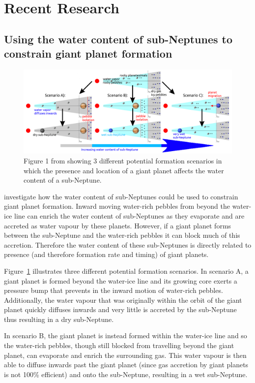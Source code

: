 \documentclass[twocolumn]{aastex631}
\begin{document}
\section{Recent Research}

\subsection{Using the water content of sub-Neptunes to constrain giant planet formation}

\begin{figure}
    \centering
    \includegraphics[width=\textwidth]{water_cartoon.png}
    \caption{Figure 1 from \citet{Bitsch+2021} showing 3 different potential formation scenarios in which the presence and location of a giant planet affects the water content of a sub-Neptune.}
    \label{fig:water}
\end{figure}

\citet{Bitsch+2021} investigate how the water content of sub-Neptunes could be used to constrain giant planet formation. Inward moving water-rich pebbles from beyond the water-ice line can enrich the water content of sub-Neptunes as they evaporate and are accreted as water vapour by these planets. However, if a giant planet forms between the sub-Neptune and the water-rich pebbles it can block much of this accretion. Therefore the water content of these sub-Neptunes is directly related to presence (and therefore formation rate and timing) of giant planets.

Figure~\ref{fig:water} illustrates three different potential formation scenarios. In scenario A, a giant planet is formed beyond the water-ice line and its growing core exerts a pressure bump that prevents in the inward motion of water-rich pebbles. Additionally, the water vapour that was originally within the orbit of the giant planet quickly diffuses inwards and very little is accreted by the sub-Neptune thus resulting in a dry sub-Neptune.

In scenario B, the giant planet is instead formed within the water-ice line and so the water-rich pebbles, though still blocked from travelling beyond the giant planet, can evaporate and enrich the surrounding gas. This water vapour is then able to diffuse inwards past the giant planet (since gas accretion by giant planets is not 100\% efficient) and onto the sub-Neptune, resulting in a wet sub-Neptune.
\end{document}
